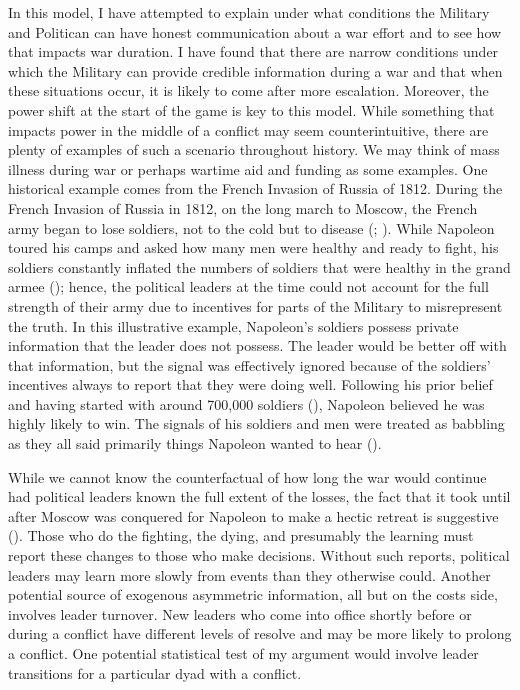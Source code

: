 \documentclass[
  12pt,
]{article}
\theoremstyle{plain}
\theoremstyle{plain}
\theoremstyle{remark}
\begin{document}
In this model, I have attempted to explain under what conditions the
Military and Politican can have honest communication about a war effort
and to see how that impacts war duration. I have found that there are
narrow conditions under which the Military can provide credible
information during a war and that when these situations occur, it is
likely to come after more escalation. Moreover, the power shift at the
start of the game is key to this model. While something that impacts
power in the middle of a conflict may seem counterintuitive, there are
plenty of examples of such a scenario throughout history. We may think
of mass illness during war or perhaps wartime aid and funding as some
examples. One historical example comes from the French Invasion of
Russia of 1812. During the French Invasion of Russia in 1812, on the
long march to Moscow, the French army began to lose soldiers, not to the
cold but to disease
(;
). While
Napoleon toured his camps and asked how many men were healthy and ready
to fight, his soldiers constantly inflated the numbers of soldiers that
were healthy in the grand armee
();
hence, the political leaders at the time could not account for the full
strength of their army due to incentives for parts of the Military to
misrepresent the truth. In this illustrative example, Napoleon's
soldiers possess private information that the leader does not possess.
The leader would be better off with that information, but the signal was
effectively ignored because of the soldiers' incentives always to report
that they were doing well. Following his prior belief and having started
with around 700,000 soldiers
(),
Napoleon believed he was highly likely to win. The signals of his
soldiers and men were treated as babbling as they all said primarily
things Napoleon wanted to hear
().

While we cannot know the counterfactual of how long the war would
continue had political leaders known the full extent of the losses, the
fact that it took until after Moscow was conquered for Napoleon to make
a hectic retreat is suggestive
(). Those who do the fighting, the dying, and presumably the
learning must report these changes to those who make decisions. Without
such reports, political leaders may learn more slowly from events than
they otherwise could. Another potential source of exogenous asymmetric
information, all but on the costs side, involves leader turnover. New
leaders who come into office shortly before or during a conflict have
different levels of resolve and may be more likely to prolong a
conflict. One potential statistical test of my argument would involve
leader transitions for a particular dyad with a conflict.
\end{document}
